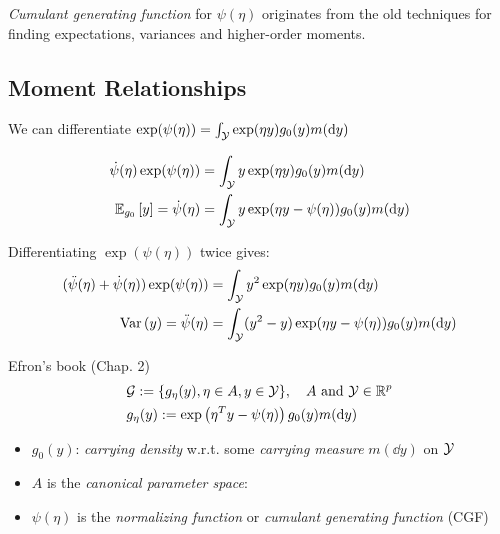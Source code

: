 \begin{remark}
	\textit{Cumulant generating function} for $\psi(\eta)$ originates from
	the old techniques for finding expectations, variances and higher-order moments.
\end{remark}

\subsection{Moment Relationships}

We can differentiate $\exp(\psi(\eta)) = \int_{\mathcal{Y}} \exp(\eta y) g_0(y)m(\dd{y})$

\begin{align*}
	\dot{\psi}(\eta) \exp(\psi(\eta)) & = \int_{\Yc} y\exp(\eta y) g_0(y) m(\dd{y})              \\
	\ERWi{g_0}{y} = \dot{\psi}(\eta)  & = \int_{\Yc} y\exp(\eta y - \psi(\eta)) g_0(y) m(\dd{y})
\end{align*}

Differentiating $\exp(\psi(\eta))$ twice gives:
\begin{align*}
	(\ddot{\psi}(\eta) + \dot{\psi}(\eta)) \exp(\psi(\eta))
	                            & = \int_{\Yc} y^2 \exp(\eta y) g_0(y) m(\dd{y})                   \\
	\VAR{y} = \ddot{\psi}(\eta) & = \int_{\Yc} (y^2 - y)\exp(\eta y - \psi(\eta)) g_0(y) m(\dd{y})
\end{align*}


Efron's book (Chap. 2)
\begin{align*}
	 & \Gc := \{g_{\eta}(y), \eta \in A, y \in \Yc \}, \quad A \text{ and } \Yc \in \Rf^p \\
	 & g_{\eta}(y) := \exp\left(\eta^T y - \psi(\eta)\right) g_0(y) m(\dd{y})
\end{align*}
\begin{itemize}
	\item $g_0(y)$: \textit{carrying density} w.r.t. some \textit{carrying measure} $m(\dd{y})$ on $\mathcal{Y}$
	\item $A$ is the \textit{canonical parameter space}:
	\item $\psi(\eta)$ is the \textit{normalizing function} or \textit{cumulant generating function} (CGF)
\end{itemize}